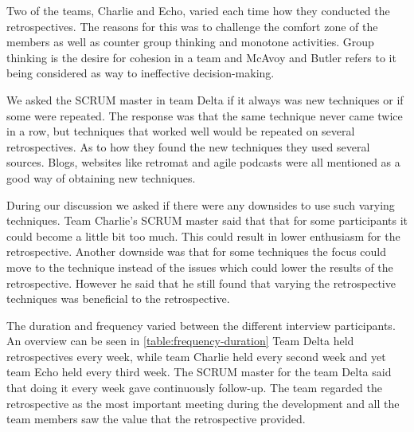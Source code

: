 Two of the teams, Charlie and Echo, varied each time how they conducted the retrospectives. The reasons for this was to challenge the comfort zone of the members as well as counter group thinking and monotone activities. Group thinking is the desire for cohesion in a team and McAvoy and Butler \cite{Mcavoy2007} refers to it being considered as way to ineffective decision-making. 

We asked the SCRUM master in team Delta if it always was new techniques or if some were repeated. The response was that the same technique never came twice in a row, but techniques that worked well would be repeated on several retrospectives. As to how they found the new techniques they used several sources. Blogs, websites like retromat \cite{retromat2015} and agile podcasts were all mentioned as a good way of obtaining new techniques. 

During our discussion we asked if there were any downsides to use such varying techniques. Team Charlie's SCRUM master said that that for some participants it could become a little bit too much. This could result in lower enthusiasm for the retrospective. Another downside was that for some techniques the focus could move to the technique instead of the issues which could lower the results of the retrospective. However he said that he still found that varying the retrospective techniques was beneficial to the retrospective. 


\begin{table}[!h]
	\begin{center}
	\caption{Retrospective Techniques Used}
	\label{table:retrospective-techique}
	\end{center}
\end{table}

\label{question-3a}
The duration and frequency varied between the different interview participants. An overview can be seen in \autoref{table:frequency-duration} Team Delta held retrospectives every week, while team Charlie held every second week and yet team Echo held every third week. The SCRUM master for the team Delta said that doing it every week gave continuously follow-up. The team regarded the retrospective as the most important meeting during the development and all the team members saw the value that the retrospective provided. 

